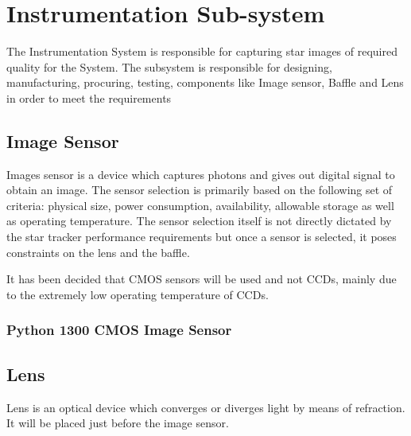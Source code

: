 \chapter{Instrumentation Sub-system}
\thispagestyle{fancy}

%
%
%
%




The Instrumentation System is responsible for capturing star images of required quality for the System. The subsystem is responsible for designing, manufacturing, procuring, testing, components like Image sensor, Baffle and Lens in order to meet the requirements 

\section{Image Sensor}
Images sensor is a device which captures photons and gives out digital signal to obtain an image.
The sensor selection is primarily based on the following set of criteria: physical size, power consumption, availability, allowable storage as well as operating temperature. The sensor selection itself is not directly dictated by the star tracker performance requirements but once a sensor is selected, it poses constraints on the lens and the baffle. \par It has been decided that CMOS sensors will be used and not CCDs, mainly due to the extremely low operating temperature of CCDs.
\subsection{Python 1300 CMOS Image Sensor}

\section{Lens}
Lens is an optical device which converges or diverges light by means of refraction. It will be placed just before the image sensor.

